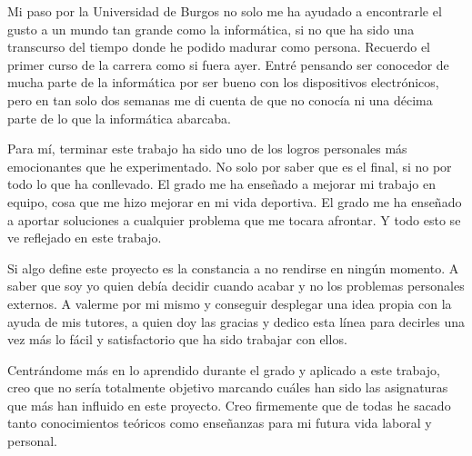 
%
%


	Mi paso por la Universidad de Burgos no solo me ha ayudado a encontrarle el gusto a un mundo tan grande como la informática, si no que ha sido una transcurso del tiempo donde he podido madurar como persona. Recuerdo el primer curso de la carrera como si fuera ayer. Entré pensando ser conocedor de mucha parte de la informática por ser bueno con los dispositivos electrónicos, pero en tan solo dos semanas me di cuenta de que no conocía ni una décima parte de lo que la informática abarcaba.
	
	Para mí, terminar este trabajo ha sido uno de los logros personales más emocionantes que he experimentado. No solo por saber que es el final, si no por todo lo que ha conllevado. El grado me ha enseñado a mejorar mi trabajo en equipo, cosa que me hizo mejorar en mi vida deportiva. El grado me ha enseñado a aportar soluciones a cualquier problema que me tocara afrontar. Y todo esto se ve reflejado en este trabajo.
	
	Si algo define este proyecto es la constancia a no rendirse en ningún momento. A saber que soy yo quien debía decidir cuando acabar y no los problemas personales externos. A valerme por mi mismo y conseguir desplegar una idea propia con la ayuda de mis tutores, a quien doy las gracias y dedico esta línea para decirles una vez más lo fácil y satisfactorio que ha sido trabajar con ellos.
	
	Centrándome más en lo aprendido durante el grado y aplicado a este trabajo, creo que no sería totalmente objetivo marcando cuáles han sido las asignaturas que más han influido en este proyecto. Creo firmemente que de todas he sacado tanto conocimientos teóricos como enseñanzas para mi futura vida laboral y personal.
	
